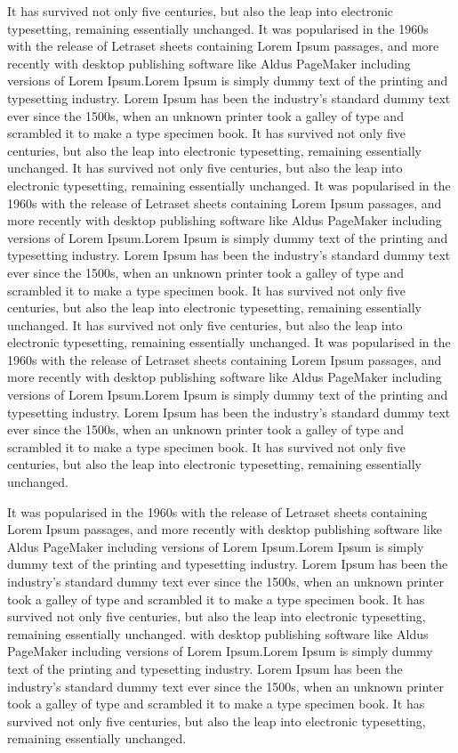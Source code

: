\documentclass{article}
\begin{document}
    It has survived not only five centuries, but also the leap into electronic typesetting, remaining essentially unchanged. It was popularised in the 1960s with the release of Letraset sheets containing Lorem Ipsum passages, and more recently with desktop publishing software like Aldus PageMaker including versions of Lorem Ipsum.Lorem Ipsum is simply dummy text of the printing and typesetting industry. Lorem Ipsum has been the industry's standard dummy text ever since the 1500s, when an unknown printer took a galley of type and scrambled it to make a type specimen book. It has survived not only five centuries, but also the leap into electronic typesetting, remaining essentially unchanged. It has survived not only five centuries, but also the leap into electronic typesetting, remaining essentially unchanged. It was popularised in the 1960s with the release of Letraset sheets containing Lorem Ipsum passages, and more recently with desktop publishing software like Aldus PageMaker including versions of Lorem Ipsum.Lorem Ipsum is simply dummy text of the printing and typesetting industry. Lorem Ipsum has been the industry's standard dummy text ever since the 1500s, when an unknown printer took a galley of type and scrambled it to make a type specimen book. It has survived not only five centuries, but also the leap into electronic typesetting, remaining essentially unchanged. It has survived not only five centuries, but also the leap into electronic typesetting, remaining essentially unchanged. It was popularised in the 1960s with the release of Letraset sheets containing Lorem Ipsum passages, and more recently with desktop publishing software like Aldus PageMaker including versions of Lorem Ipsum.Lorem Ipsum is simply dummy text of the printing and typesetting industry. Lorem Ipsum has been the industry's standard dummy text ever since the 1500s, when an unknown printer took a galley of type and scrambled it to make a type specimen book. It has survived not only five centuries, but also the leap into electronic typesetting, remaining essentially unchanged. 

    It was popularised in the 1960s with the release of Letraset sheets containing Lorem Ipsum passages, and more recently with desktop publishing software like Aldus PageMaker including versions of Lorem Ipsum.Lorem Ipsum is simply dummy text of the printing and typesetting industry. Lorem Ipsum has been the industry's standard dummy text ever since the 1500s, when an unknown printer took a galley of type and scrambled it to make a type specimen book. It has survived not only five centuries, but also the leap into electronic typesetting, remaining essentially unchanged. with desktop publishing software like Aldus PageMaker including versions of Lorem Ipsum.Lorem Ipsum is simply dummy text of the printing and typesetting industry. Lorem Ipsum has been the industry's standard dummy text ever since the 1500s, when an unknown printer took a galley of type and scrambled it to make a type specimen book. It has survived not only five centuries, but also the leap into electronic typesetting, remaining essentially unchanged. 
\end{document}
